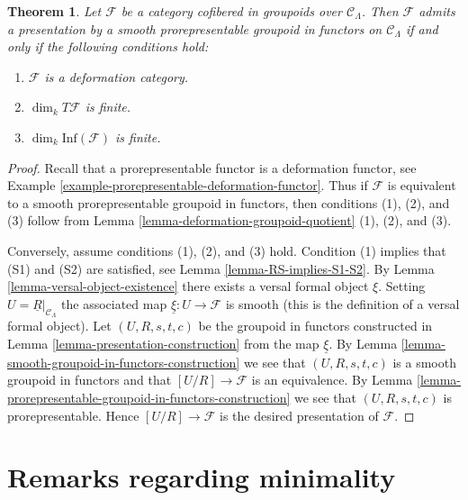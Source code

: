 \documentclass{stacks-project}
\theoremstyle{plain}
\newtheorem{theorem}[subsection]{Theorem}
\theoremstyle{definition}
\theoremstyle{remark}
\numberwithin{equation}{subsection}
\begin{document}
\begin{theorem}
\label{theorem-presentation-deformation-groupoid}
Let $\mathcal{F}$ be a category cofibered in groupoids over
$\mathcal{C}_\Lambda$. Then $\mathcal{F}$ admits a presentation by a
smooth prorepresentable groupoid in functors on $\mathcal{C}_\Lambda$
if and only if the following conditions hold:
\begin{enumerate}
\item $\mathcal{F}$ is a deformation category.
\item $\dim_k T\mathcal{F}$ is finite.
\item $\dim_k \text{Inf}(\mathcal{F})$ is finite.
\end{enumerate}
\end{theorem}

\begin{proof}
Recall that a prorepresentable functor is a deformation functor, see
Example \ref{example-prorepresentable-deformation-functor}. Thus
if $\mathcal{F}$ is equivalent to a smooth prorepresentable groupoid in
functors, then conditions (1), (2), and (3) follow from
Lemma \ref{lemma-deformation-groupoid-quotient} (1), (2), and (3).

\medskip\noindent
Conversely, assume conditions (1), (2), and (3) hold. Condition (1)
implies that (S1) and (S2) are satisfied, see
Lemma \ref{lemma-RS-implies-S1-S2}.
By
Lemma \ref{lemma-versal-object-existence}
there exists a versal formal object $\xi$. Setting
$U = \underline{R}|_{\mathcal{C}_\Lambda}$ the
associated map $\underline{\xi} : U \to \mathcal{F}$ is smooth (this is
the definition of a versal formal object).
Let $(U, R, s, t, c)$ be the groupoid in functors constructed in
Lemma \ref{lemma-presentation-construction}
from the map $\underline{\xi}$. By
Lemma \ref{lemma-smooth-groupoid-in-functors-construction}
we see that $(U, R, s, t, c)$ is a smooth groupoid in functors and that
$[U/R] \to \mathcal{F}$ is an equivalence. By
Lemma \ref{lemma-prorepresentable-groupoid-in-functors-construction}
we see that $(U, R, s, t, c)$ is prorepresentable.
Hence $[U/R] \to \mathcal{F}$ is the desired presentation of $\mathcal{F}$.
\end{proof}








\section{Remarks regarding minimality}
\label{section-minimality}
\end{document}
